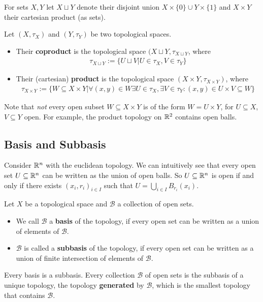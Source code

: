 For sets $X,Y$ let $X \sqcup Y$ denote their disjoint union $X \times \{0\} \cup Y \times \{1\}$ and $X \times Y$ their cartesian product (as sets).
\begin{dfn}[]
  Let $(X,\tau_X)$ and $(Y,\tau_Y)$ be two topological spaces. 
  \begin{itemize}
    \item Their \textbf{coproduct} is the topological space $(X \sqcup Y, \tau_{X \sqcup Y}$, where
      \begin{align*}
        \tau_{X \sqcup Y} := \{U \sqcup V \big\vert U \in \tau_X, V \in \tau_Y\}
      \end{align*}
    \item Their (cartesian) \textbf{product} is the topological space $(X \times Y, \tau_{X \times Y})$, where
      \begin{align*}
        \tau_{X \times Y} := \{W \subseteq X \times Y \big\vert \forall (x,y) \in W \exists U \in \tau_X, \exists V \in \tau_Y: (x,y) \in U \times V \subseteq W \}
      \end{align*}
  \end{itemize}
\end{dfn}
Note that \emph{not} every open subset $W \subseteq X \times Y$ is of the form $W = U \times Y$, for $U \subseteq X$, $V \subseteq Y$ open. For example, the product topology on $\mathbb{R}^{2}$ contains open balls.


\subsection{Basis and Subbasis}
Consider $\mathbb{R}^{n}$ with the euclidean topology. 
We can intuitively see that every open set $U \subseteq \mathbb{R}^{n}$ can be written as the union of open balls.
So $U \subseteq \mathbb{R}^{n}$ is open if and only if there exists $(x_i,r_i)_{i \in I}$ such that $U = \bigcup_{i \in I}B_{r_i}(x_i)$.

\begin{dfn}[]
Let $X$ be a topological space and $\mathcal{B}$ a collection of open sets.
\begin{itemize}
  \item We call $\mathcal{B}$ a \textbf{basis} of the topology, if every open set can be written as a union of elements of $\mathcal{B}$.
  \item $\mathcal{B}$ is called a \textbf{subbasis} of the topology, if every open set can be written as a union of finite intersection of elements of $\mathcal{B}$.
\end{itemize}
\end{dfn}
\begin{rem}[]
  Every basis is a subbasis.
  Every collection $\mathcal{B}$ of open sets is the subbasis of a unique topology, the topology \textbf{generated} by $\mathcal{B}$, which is the smallest topology that contains $\mathcal{B}$.
\end{rem}


